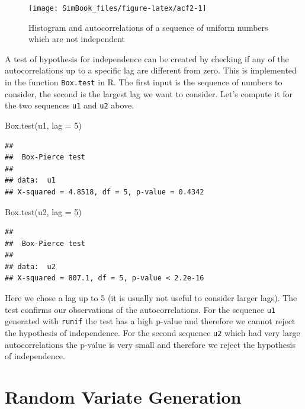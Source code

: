 \documentclass[
]{book}
\newenvironment{Shaded}{\begin{snugshade}}{\end{snugshade}}
\newcommand{\AttributeTok}[1]{\textcolor[rgb]{0.77,0.63,0.00}{#1}}
\newcommand{\DecValTok}[1]{\textcolor[rgb]{0.00,0.00,0.81}{#1}}
\newcommand{\FunctionTok}[1]{\textcolor[rgb]{0.00,0.00,0.00}{#1}}
\newcommand{\NormalTok}[1]{#1}
\begin{document}
\begin{figure}

{\centering \texttt{[image: SimBook\_files/figure-latex/acf2-1]} 

}

\caption{Histogram and autocorrelations of a sequence of uniform numbers which are not independent}\label{fig:acf2}
\end{figure}

A test of hypothesis for independence can be created by checking if any of the autocorrelations up to a specific lag are different from zero. This is implemented in the function \texttt{Box.test} in R. The first input is the sequence of numbers to consider, the second is the largest lag we want to consider. Let's compute it for the two sequences \texttt{u1} and \texttt{u2} above.

\begin{Shaded}
\begin{Highlighting}[]
\FunctionTok{Box.test}\NormalTok{(u1, }\AttributeTok{lag =} \DecValTok{5}\NormalTok{)}
\end{Highlighting}
\end{Shaded}

\begin{verbatim}
## 
##  Box-Pierce test
## 
## data:  u1
## X-squared = 4.8518, df = 5, p-value = 0.4342
\end{verbatim}

\begin{Shaded}
\begin{Highlighting}[]
\FunctionTok{Box.test}\NormalTok{(u2, }\AttributeTok{lag =} \DecValTok{5}\NormalTok{)}
\end{Highlighting}
\end{Shaded}

\begin{verbatim}
## 
##  Box-Pierce test
## 
## data:  u2
## X-squared = 807.1, df = 5, p-value < 2.2e-16
\end{verbatim}

Here we chose a lag up to 5 (it is usually not useful to consider larger lags). The test confirms our observations of the autocorrelations. For the sequence \texttt{u1} generated with \texttt{runif} the test has a high p-value and therefore we cannot reject the hypothesis of independence. For the second sequence \texttt{u2} which had very large autocorrelations the p-value is very small and therefore we reject the hypothesis of independence.

\hypertarget{random-variate-generation}{%
\section{Random Variate Generation}\label{random-variate-generation}}
\end{document}
